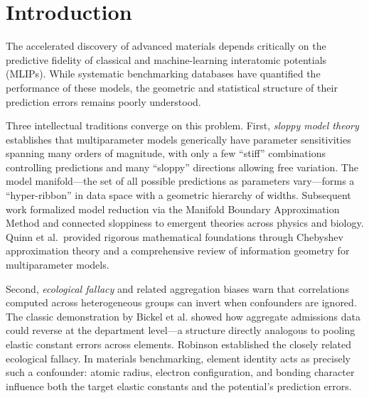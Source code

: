 \documentclass[twocolumn,9pt]{extarticle}
\begin{document}
\maketitle
\thispagestyle{fancy}



\section{Introduction}

The accelerated discovery of advanced materials depends critically on the predictive fidelity of classical and machine-learning interatomic potentials (MLIPs)\cite{frederiksen2004,mortensen2005}. While systematic benchmarking databases have quantified the performance of these models\cite{kurniawan2022,openkim,choudhary2017jarvisff,chiang2025mliparena}, the geometric and statistical structure of their prediction errors remains poorly understood.

Three intellectual traditions converge on this problem. First, \textit{sloppy model theory} establishes that multiparameter models generically have parameter sensitivities spanning many orders of magnitude, with only a few ``stiff'' combinations controlling predictions and many ``sloppy'' directions allowing free variation\cite{brown2003,waterfall2006,gutenkunst2007}. The model manifold---the set of all possible predictions as parameters vary---forms a ``hyper-ribbon'' in data space with a geometric hierarchy of widths\cite{transtrum2010,transtrum2011,machta2013}. Subsequent work formalized model reduction via the Manifold Boundary Approximation Method\cite{transtrum2014} and connected sloppiness to emergent theories across physics and biology\cite{transtrum2015}. Quinn et al.\ provided rigorous mathematical foundations through Chebyshev approximation theory\cite{quinn2019} and a comprehensive review of information geometry for multiparameter models\cite{quinn2023}.

Second, \textit{ecological fallacy} and related aggregation biases warn that correlations computed across heterogeneous groups can invert when confounders are ignored\cite{simpson1951,blyth1972,pearl2014}. The classic demonstration by Bickel et al.\cite{bickel1975} showed how aggregate admissions data could reverse at the department level---a structure directly analogous to pooling elastic constant errors across elements. Robinson\cite{robinson1950} established the closely related ecological fallacy. In materials benchmarking, element identity acts as precisely such a confounder: atomic radius, electron configuration, and bonding character influence both the target elastic constants and the potential's prediction errors\cite{pearl2009}.
\end{document}
